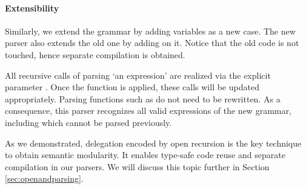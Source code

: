 
%
%

\paragraph{Extensibility} Similarly, we extend the grammar by adding variables as a new case. The new parser also extends the old one by adding  on it. Notice that the old code is not touched, hence separate compilation is obtained.



All recursive calls of parsing `an expression' are realized via the explicit parameter . Once the  function is applied, these calls will be updated appropriately. Parsing functions such as  do not need to be rewritten. As a consequence, this parser recognizes all valid expressions of the new grammar, including  which cannot be parsed previously.


As we demonstrated, delegation encoded by open recursion is the key technique to obtain semantic modularity. It enables type-safe code reuse and separate compilation in our parsers. We will discuss this topic further in Section \ref{sec:openandparsing}.


